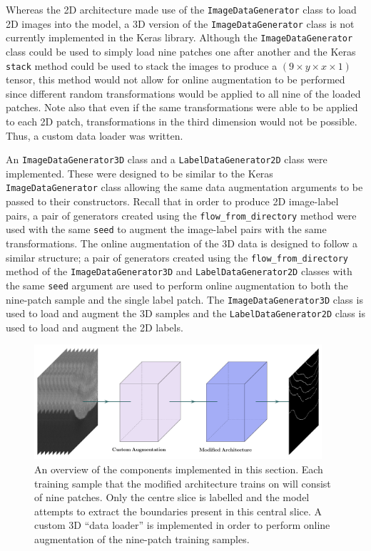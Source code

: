 Whereas the 2D architecture made use of the \texttt{ImageDataGenerator} class to load 2D images into the model, a 3D version of the \texttt{ImageDataGenerator} class is not currently implemented in the Keras library. Although the \texttt{ImageDataGenerator} class could be used to simply load nine patches one after another and the Keras \texttt{stack} method could be used to stack the images to produce a $(9 \times y \times x \times 1)$ tensor, this method would not allow for online augmentation to be performed since different random transformations would be applied to all nine of the loaded patches. Note also that even if the same transformations were able to be applied to each 2D patch, transformations in the third dimension would not be possible. Thus, a custom data loader was written.

An \texttt{ImageDataGenerator3D} class and a \texttt{LabelDataGenerator2D} class were implemented. These were designed to be similar to the Keras \texttt{ImageDataGenerator} class allowing the same data augmentation arguments to be passed to their constructors. Recall that in order to produce 2D image-label pairs, a pair of generators created using the \texttt{flow\_from\_directory} method were used with the same \texttt{seed} to augment the image-label pairs with the same transformations. The online augmentation of the 3D data is designed to follow a similar structure; a pair of generators created using the \texttt{flow\_from\_directory} method of the \texttt{ImageDataGenerator3D} and \texttt{LabelDataGenerator2D} classes with the same \texttt{seed} argument are used to perform online augmentation to both the nine-patch sample and the single label patch. The \texttt{ImageDataGenerator3D} class is used to load and augment the 3D samples and the \texttt{LabelDataGenerator2D} class is used to load and augment the 2D labels.

\begin{figure}[t]
    \centering
    \includegraphics[width=0.95\textwidth]{images/3D-overview.pdf}
    \caption{An overview of the components implemented in this section. Each training sample that the modified architecture trains on will consist of nine patches. Only the centre slice is labelled and the model attempts to extract the boundaries present in this central slice. A custom 3D ``data loader'' is implemented in order to perform online augmentation of the nine-patch training samples.}
    \label{fig:3doverview}
\end{figure}

